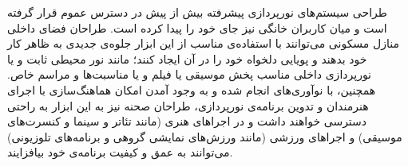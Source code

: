 \documentclass[12pt,twocolumn,a4paper,oneside]{article}
\begin{document}
طراحی سیستم‌های نورپردازی پیشرفته بیش از پیش در دسترس عموم قرار گرفته است و میان کاربران خانگی نیز جای خود را پیدا کرده است. طراحان فضای داخلی منازل مسکونی می‌توانند با استفاده‌ی مناسب از این ابزار جلوه‌ی جدیدی به ظاهر کار خود بدهند و پویایی دلخواه خود را در آن ایجاد کنند؛ مانند نور محیطی ثابت و یا نورپردازی داخلی مناسب پخش موسیقی یا فیلم و یا مناسبت‌ها و مراسم خاص. همچنین، با نوآوری‌های انجام شده و به وجود آمدن امکان هماهنگ‌سازی با اجرای هنرمندان و تدوین برنامه‌ی نورپردازی، طراحان صحنه نیز به این ابزار به راحتی دسترسی خواهند داشت و در اجراهای هنری (مانند تئاتر و سینما و کنسرت‌های موسیقی) و اجراهای ورزشی (مانند ورزش‌های نمایشی گروهی و برنامه‌های تلوزیونی) می‌توانند به عمق و کیفیت برنامه‌ی خود بیافزایند.



\end{document}
